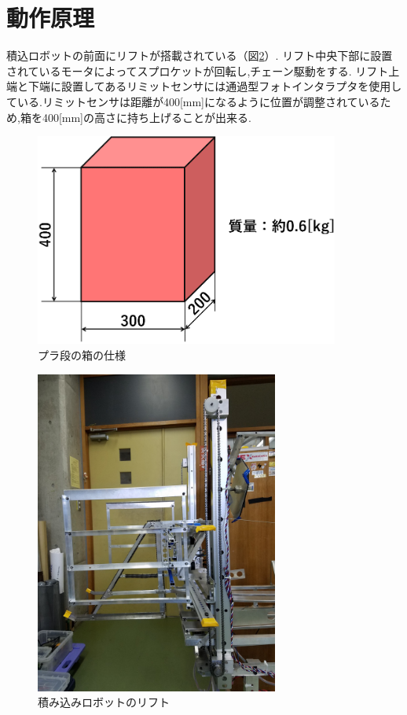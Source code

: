 \section{動作原理}
積込ロボットの前面にリフトが搭載されている（図\ref{fig:lift}）.
リフト中央下部に設置されているモータによってスプロケットが回転し,チェーン駆動をする.
リフト上端と下端に設置してあるリミットセンサには通過型フォトインタラプタを使用している.リミットセンサは距離が400[mm]になるように位置が調整されているため,箱を400[mm]の高さに持ち上げることが出来る.


\begin{figure}[htbp]
  \begin{center}
    \includegraphics[width=100mm]{img/plabox.png}
    \end{center}
  \caption{プラ段の箱の仕様}
 \label{fig:plabox}
\end{figure}

\begin{figure}[htbp]
  \begin{center}
    \includegraphics[width=80mm]{img/lift.jpg}
    \end{center}
  \caption{積み込みロボットのリフト}
 \label{fig:lift}
\end{figure}

